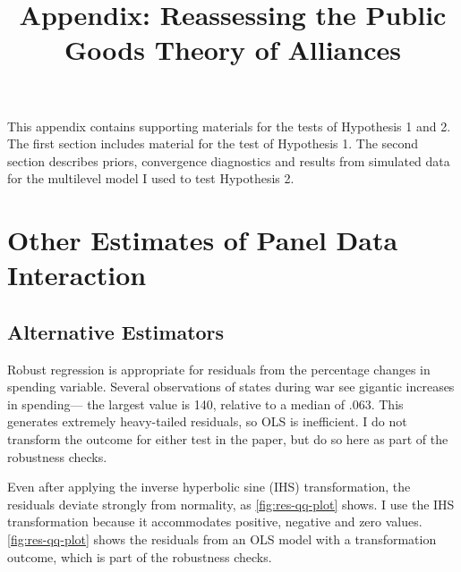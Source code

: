\documentclass[12pt]{article}
\title{
\textbf{Appendix: Reassessing the Public Goods Theory of Alliances}
	}
\begin{document}
\maketitle 

\doublespace

This appendix contains supporting materials for the tests of Hypothesis 1 and 2. 
The first section includes material for the test of Hypothesis 1. 
The second section describes priors, convergence diagnostics and results from simulated data for the multilevel model I used to test Hypothesis 2. 

\section{Other Estimates of Panel Data Interaction}


\subsection{Alternative Estimators}


Robust regression is appropriate for residuals from the percentage changes in spending variable. 
Several observations of states during war see gigantic increases in spending--- the largest value is 140, relative to a median of .063. 
This generates extremely heavy-tailed residuals, so OLS is inefficient. 
I do not transform the outcome for either test in the paper, but do so here as part of the robustness checks. 


Even after applying the inverse hyperbolic sine (IHS) transformation, the residuals deviate strongly from normality, as \autoref{fig:res-qq-plot} shows. 
I use the IHS transformation because it accommodates positive, negative and zero values. 
\autoref{fig:res-qq-plot} shows the residuals from an OLS model with a transformation outcome, which is part of the robustness checks.
\end{document}
